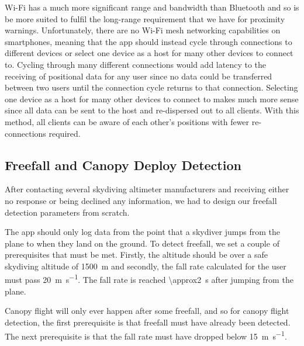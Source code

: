 Wi-Fi has a much more significant range and bandwidth than Bluetooth and so is be more suited to fulfil the long-range requirement that we have for proximity warnings. Unfortunately, there are no Wi-Fi mesh networking capabilities on smartphones, meaning that the app should instead cycle through connections to different devices or select one device as a host for many other devices to connect to. Cycling through many different connections would add latency to the receiving of positional data for any user since no data could be transferred between two users until the connection cycle returns to that connection. Selecting one device as a host for many other devices to connect to makes much more sense since all data can be sent to the host and re-dispersed out to all clients. With this method, all clients can be aware of each other's positions with fewer re-connections required.

\subsection{Freefall and Canopy Deploy Detection}
After contacting several skydiving altimeter manufacturers and receiving either no response or being declined any information, we had to design our freefall detection parameters from scratch.

The app should only log data from the point that a skydiver jumps from the plane to when they land on the ground. To detect freefall, we set a couple of prerequisites that must be met. Firstly, the altitude should be over a safe skydiving altitude of \SI{1500}{\metre} and secondly, the fall rate calculated for the user must pass \SI{20}{\metre\per\second}. The fall rate is reached \SI{\approx2}{\second} after jumping from the plane.

Canopy flight will only ever happen after some freefall, and so for canopy flight detection, the first prerequisite is that freefall must have already been detected. The next prerequisite is that the fall rate must have dropped below \SI{15}{\metre\per\second}.
